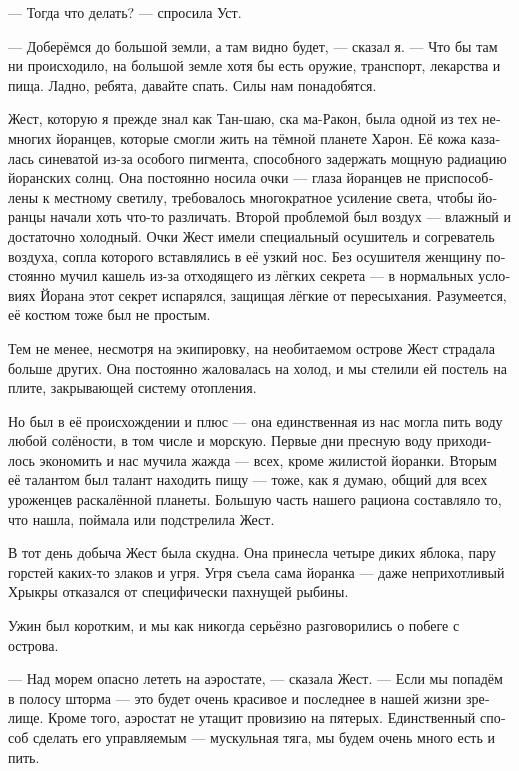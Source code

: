 \documentclass[a4paper,12pt,fleqn]{book}\usepackage{polyglossia}\setdefaultlanguage[babelshorthands=true]{russian}\setotherlanguage{english}\defaultfontfeatures{Ligatures=TeX,Mapping=tex-text}
\newcommand{\asterism}{\vspace{1em}{\centering\Large\bfseries$\ast~\ast~\ast$\par}\vspace{1em}}
\begin{document}
--- Тогда что делать? --- спросила Уст.

--- Доберёмся до большой земли, а там видно будет, --- сказал я.
--- Что бы там ни происходило, на большой земле хотя бы есть оружие, транспорт, лекарства и пища.
Ладно, ребята, давайте спать.
Силы нам понадобятся.

\asterism

Жест, которую я прежде знал как Тан-шаю, ска ма-Ракон, была одной из тех немногих йоранцев, которые смогли жить на тёмной планете Харон.
Её кожа казалась синеватой из-за особого пигмента, способного задержать мощную радиацию йоранских солнц.
Она постоянно носила очки --- глаза йоранцев не приспособлены к местному светилу, требовалось многократное усиление света, чтобы йоранцы начали хоть что-то различать.
Второй проблемой был воздух --- влажный и достаточно холодный.
Очки Жест имели специальный осушитель и согреватель воздуха, сопла которого вставлялись в её узкий нос.
Без осушителя женщину постоянно мучил кашель из-за отходящего из лёгких секрета --- в нормальных условиях Йорана этот секрет испарялся, защищая лёгкие от пересыхания.
Разумеется, её костюм тоже был не простым.

Тем не менее, несмотря на экипировку, на необитаемом острове Жест страдала больше других.
Она постоянно жаловалась на холод, и мы стелили ей постель на плите, закрывающей систему отопления.

Но был в её происхождении и плюс --- она единственная из нас могла пить воду любой солёности, в том числе и морскую.
Первые дни пресную воду приходилось экономить и нас мучила жажда --- всех, кроме жилистой йоранки.
Вторым её талантом был талант находить пищу --- тоже, как я думаю, общий для всех уроженцев раскалённой планеты.
Большую часть нашего рациона составляло то, что нашла, поймала или подстрелила Жест.

\asterism

В тот день добыча Жест была скудна.
Она принесла четыре диких яблока, пару горстей каких-то злаков и угря.
Угря съела сама йоранка --- даже неприхотливый Хрыкры отказался от специфически пахнущей рыбины.

Ужин был коротким, и мы как никогда серьёзно разговорились о побеге с острова. 

--- Над морем опасно лететь на аэростате, --- сказала Жест.
--- Если мы попадём в полосу шторма --- это будет очень красивое и последнее в нашей жизни зрелище.
Кроме того, аэростат не утащит провизию на пятерых.
Единственный способ сделать его управляемым --- мускульная тяга, мы будем очень много есть и пить.
\end{document}
